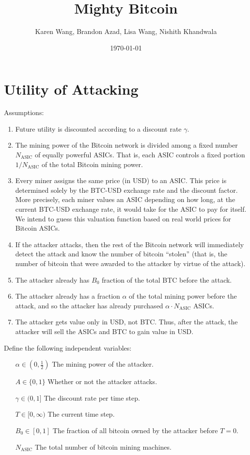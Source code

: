 \documentclass[12pt]{article}
\title{Mighty Bitcoin}
\author{Karen Wang, Brandon Azad, Lisa Wang, Nishith Khandwala}
\date{\today}
\newcommand*{\Attack}{A}
\newcommand*{\Time}{T}
\newcommand*{\ABtcOrig}{{B_0}}
\newcommand*{\NumAsics}{{N_{\mathrm{ASIC}}}}
\begin{document}
\maketitle

\section{Utility of Attacking}

Assumptions:
\begin{enumerate}
	\item
		Future utility is discounted according to a discount rate $\gamma$.
	\item
		The mining power of the Bitcoin network is divided among a fixed number
		$\NumAsics$ of equally powerful ASICs. That is, each ASIC controls a fixed
		portion $1/\NumAsics$ of the total Bitcoin mining power.
	\item
		Every miner assigns the same price (in USD) to an ASIC. This price is
		determined solely by the BTC-USD exchange rate and the discount factor.
		More precisely, each miner values an ASIC depending on how long, at the
		current BTC-USD exchange rate, it would take for the ASIC to pay for
		itself. We intend to guess this valuation function based on real world
		prices for Bitcoin ASICs.
	\item
		If the attacker attacks, then the rest of the Bitcoin network will
		immediately detect the attack and know the number of bitcoin ``stolen''
		(that is, the number of bitcoin that were awarded to the attacker by virtue
		of the attack).
	\item
		The attacker already has $\ABtcOrig$ fraction of the total BTC
		before the attack.
	\item
		The attacker already has a fraction $\alpha$ of the total mining power
		before the attack, and so the attacker has already purchased $\alpha \cdot
		\NumAsics$ ASICs.
	\item
		The attacker gets value only in USD, not BTC. Thus, after the attack, the
		attacker will sell the ASICs and BTC to gain value in USD.
\end{enumerate}

Define the following independent variables:

\begin{enumerate}[labelindent=0pt,labelwidth=2in,itemindent=0em,align=parleft,leftmargin=!]
	\item[{$\alpha \in (0, \frac{1}{2})$}]
		The mining power of the attacker.
	\item[{$\Attack \in \{0, 1\}$}]
		Whether or not the attacker attacks.
	\item[{$\gamma \in (0, 1]$}]
		The discount rate per time step.
	\item[{$\Time \in [0, \infty)$}]
		The current time step.
	\item[{$\ABtcOrig \in [0, 1]$}]
		The fraction of all bitcoin owned by the attacker before $T = 0$.
	\item[$\NumAsics$]
		The total number of bitcoin mining machines.
\end{enumerate}
\end{document}
